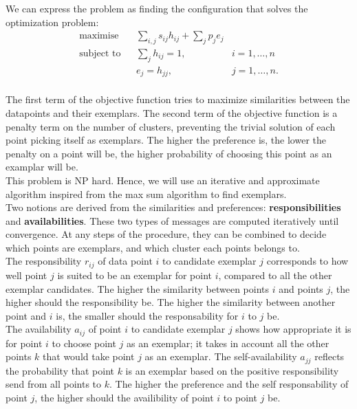 \documentclass{ipol}
\begin{document}
We can express the problem as finding the configuration that solves the
optimization problem:
\begin{equation*}
\renewcommand{\arraystretch}{2}
\begin{array}{ccll}
\text{maximise} & & \sum_{i, j} s_{ij} h_{ij} + \sum_{j} p_j e_j & \\
\text{subject to} &  & \sum_{j} h_{ij} = 1, & i = 1, \dots, n \\
		  &  & e_{j} = h_{jj}, & j = 1, \dots, n.\\
\end{array}
\end{equation*}

The first term of the objective function tries to maximize similarities
between the datapoints and their exemplars. The second term of the objective
function is a penalty term on the number of clusters, preventing the trivial
solution of each point picking itself as exemplars. The higher the preference
is, the lower the penalty on a point will be, the higher probability of
choosing this point as an examplar will be. \\

This problem is NP hard. Hence, we will use an iterative and approximate
algorithm inspired from the max sum algorithm to find exemplars. \\

Two notions are derived from the similarities and preferences:
\textbf{responsibilities} and \textbf{availabilities}. These two types of
messages are computed iteratively until convergence. At any steps of the
procedure, they can be combined to decide which points are exemplars, and
which cluster each points belongs to.\\

The responsibility $r_{ij}$ of data point $i$ to candidate exemplar $j$
corresponds to how well point $j$ is suited to be an exemplar for point $i$,
compared to all the other exemplar candidates. The higher the similarity
between points $i$ and points $j$, the higher should the responsibility be.
The higher the similarity between another point and $i$ is, the smaller should
the responsability for $i$ to $j$ be.\\

The availability $a_{ij}$ of point $i$ to candidate exemplar $j$ shows how
appropriate it is for point $i$ to choose point $j$ as an exemplar; it takes
in account all the other points $k$ that would take point $j$ as an exemplar.
The self-availability $a_{jj}$ reflects the probability that point $k$ is an
exemplar based on the positive responsibility send from all points to $k$. The
higher the preference and the self responsability of point $j$, the higher
should the availibility of point $i$ to point $j$ be. \\
\end{document}
